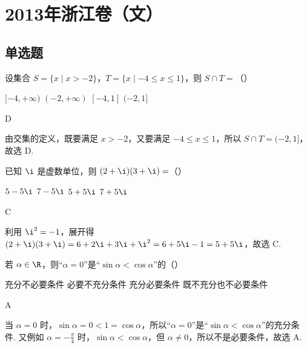 \chapter{2013年浙江卷（文）}

\section{单选题}

\begin{problem}
设集合 \( S = \{x \mid x > -2\} \)，\( T = \{x \mid -4 \leqslant x \leqslant 1\} \)，则 \( S \cap T = \)（\quad）

\choices
    {\([-4, +\infty)\)}
    {\((-2, +\infty)\)}
    {\([-4, 1]\)}
    {\((-2, 1]\)}
\end{problem}

\begin{answer}
D
\end{answer}

\begin{solution}
由交集的定义，既要满足 \(x>-2\)，又要满足 \(-4\leqslant x\leqslant1\)，所以
\(S\cap T=(-2,1]\)，故选 D.
\end{solution}

\begin{problem}
已知 \(\i\) 是虚数单位，则 \( (2 + \i)(3 + \i) = \)（\quad）

\choices
    {\(5 - 5\i\)}
    {\(7 - 5\i\)}
    {\(5 + 5\i\)}
    {\(7 + 5\i\)}

\end{problem}

\begin{answer}
C
\end{answer}

\begin{solution}
利用 \(\i^2=-1\)，展开得
\((2+\i)(3+\i)=6+2\i+3\i+\i^2=6+5\i-1=5+5\i\)，故选 C.
\end{solution}

\begin{problem}
若 \(\alpha \in \R\)，则“\(\alpha = 0\)”是“\(\sin \alpha < \cos \alpha\)”的（\quad）

\choices
    {充分不必要条件}
    {必要不充分条件}
    {充分必要条件}
    {既不充分也不必要条件}

\end{problem}

\begin{answer}
A
\end{answer}

\begin{solution}
当 \(\alpha=0\) 时，\(\sin\alpha=0<1=\cos\alpha\)，所以“\(\alpha=0\)”是“\(\sin\alpha<\cos\alpha\)”的充分条件. 又例如 \(\alpha=-\frac{\pi}{4}\) 时，\(\sin\alpha<\cos\alpha\)，但 \(\alpha\ne0\)，所以不是必要条件，故选 A.
\end{solution}

